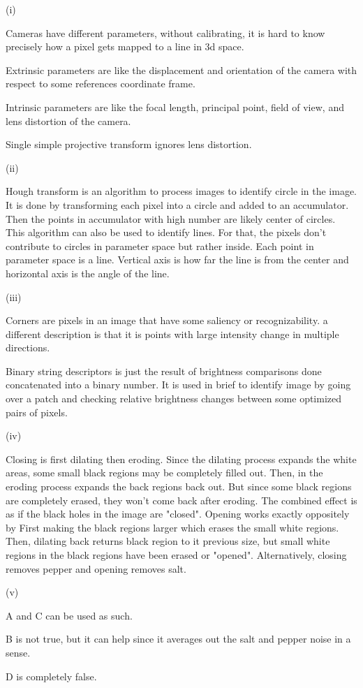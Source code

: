 \begin{solutionbox}[Q1-9]

    (i)

    Cameras have different parameters, without calibrating, it is hard to know precisely how a pixel gets mapped to a line in 3d space.

    Extrinsic parameters are like the displacement and orientation of the camera with respect to some references coordinate frame.

    Intrinsic parameters are like the focal length, principal point, field of view, and lens distortion of the camera.

    Single simple projective transform ignores lens distortion.


    (ii)

    Hough transform is an algorithm to process images to identify circle in the image. It is done by transforming each pixel into a circle and added to an accumulator. Then the points in accumulator with high number are likely center of circles. This algorithm can also be used to identify lines. For that, the pixels don't contribute to circles in parameter space but rather inside. Each point in parameter space is a line. Vertical axis is how far the line is from the center and horizontal axis is the angle of the line.

    (iii)

    Corners are pixels in an image that have some saliency or recognizability. a different description is that it is points with large intensity change in multiple directions.

    Binary string descriptors is just the result of brightness comparisons done concatenated into a binary number. It is used in brief to identify image by going over a patch and checking relative brightness changes between some optimized pairs of pixels.

    (iv)

    Closing is first dilating then eroding. Since the dilating process expands the white areas, some small black regions may be completely filled out. Then, in the eroding process expands the back regions back out. But since some black regions are completely erased, they won't come back after eroding. The combined effect is as if the black holes in the image are "closed". Opening works exactly oppositely by First making the black regions larger which erases the small white regions. Then, dilating back returns black region to it previous size, but small white regions in the black regions have been erased or "opened". Alternatively, closing removes pepper and opening removes salt.

    (v)

    A and C can be used as such.

    B is not true, but it can help since it averages out the salt and pepper noise in a sense.

    D is completely false.
\end{solutionbox}

